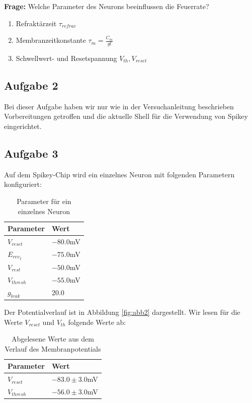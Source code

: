\documentclass[10pt,a4paper]{scrartcl}
\begin{document}
\noindent \textbf{Frage:} Welche Parameter des Neurons beeinflussen die Feuerrate?

\begin{enumerate}
\item Refraktärzeit $\tau_{refrac}$
\item Membranzeitkonstante $\tau_m=\frac{C_m}{gl}$ 
\item Schwellwert- und Resetspannung $V_{th} , V_{reset}$
\end{enumerate}


\subsection{Aufgabe 2}
Bei dieser Aufgabe haben wir nur wie in der Versuchanleitung beschrieben Vorbereitungen getroffen und die aktuelle Shell für die Verwendung von Spikey eingerichtet.


\subsection{Aufgabe 3}
\noindent Auf dem Spikey-Chip wird ein einzelnes Neuron mit folgenden Parametern konfiguriert:

\begin{table}[H]
\centering
\captionsetup{justification=centering}
\caption{Parameter für ein einzelnes Neuron}
\begin{tabular}{l|l}
 Parameter&Wert\\
\hline
$V_{reset}$&$-80.0$mV\\
$E_{rev_I}$&$-75.0$mV\\
$V_{rest}$&$-50.0$mV\\
$V_{thresh}$&$-55.0$mV\\
$g_{leak}$&$20.0$
\end{tabular}
\label{tab:01}
\end{table}

\noindent Der Potentialverlauf ist in Abbildung \ref{fig:abb2} dargestellt. Wir lesen für die Werte $V_{reset}$ und $V_{th}$ folgende Werte ab:

\begin{table}[H]
\centering
\captionsetup{justification=centering}
\caption{Abgelesene Werte aus dem Verlauf des Membranpotentials}
\begin{tabular}{l|l}
 Parameter&Wert\\
\hline
$V_{reset}$&$-83.0 \pm 3.0$mV\\
$V_{thresh}$&$-56.0 \pm 3.0$mV
\end{tabular}
\label{tab:02}
\end{table}
\end{document}
